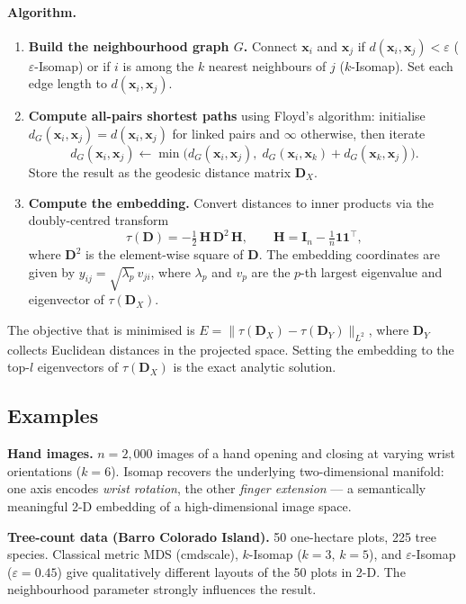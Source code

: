 \documentclass[11pt, oneside]{book}
\newcommand{\T}{^{\top}}
\begin{document}
\paragraph{Algorithm.}
\begin{enumerate}
  \item \textbf{Build the neighbourhood graph $G$.} Connect $\bm{x}_i$ and
        $\bm{x}_j$ if $d(\bm{x}_i,\bm{x}_j)<\varepsilon$ ($\varepsilon$-Isomap)
        or if $i$ is among the $k$ nearest neighbours of $j$ ($k$-Isomap).
        Set each edge length to $d(\bm{x}_i,\bm{x}_j)$.
  \item \textbf{Compute all-pairs shortest paths} using Floyd's algorithm:
        initialise $d_G(\bm{x}_i,\bm{x}_j)=d(\bm{x}_i,\bm{x}_j)$ for linked
        pairs and $\infty$ otherwise, then iterate
        \[d_G(\bm{x}_i,\bm{x}_j)\leftarrow
          \min\bigl(d_G(\bm{x}_i,\bm{x}_j),\;
                    d_G(\bm{x}_i,\bm{x}_k)+d_G(\bm{x}_k,\bm{x}_j)\bigr).\]
        Store the result as the geodesic distance matrix $\bm{D}_X$.
  \item \textbf{Compute the embedding.} Convert distances to inner products via
        the doubly-centred transform
        \[\tau(\bm{D}) = -\tfrac{1}{2}\,\bm{H}\,\bm{D}^2\,\bm{H},\qquad
          \bm{H}=\bm{I}_n-\tfrac{1}{n}\mathbf{1}\mathbf{1}\T,\]
        where $\bm{D}^2$ is the element-wise square of $\bm{D}$.
        The embedding coordinates are given by
        $y_{ij}=\sqrt{\lambda_p}\,v_{ji}$,
        where $\lambda_p$ and $v_p$ are the $p$-th largest eigenvalue and
        eigenvector of $\tau(\bm{D}_X)$.
\end{enumerate}

The objective that is minimised is
$E=\|\tau(\bm{D}_X)-\tau(\bm{D}_Y)\|_{L^2}$, where
$\bm{D}_Y$ collects Euclidean distances in the projected space.
Setting the embedding to the top-$l$ eigenvectors of $\tau(\bm{D}_X)$ is the
exact analytic solution.

\subsection{Examples}

\textbf{Hand images.} $n=2{,}000$ images of a hand opening and closing at
varying wrist orientations ($k=6$).
Isomap recovers the underlying two-dimensional manifold: one axis encodes
\emph{wrist rotation}, the other \emph{finger extension} — a semantically
meaningful 2-D embedding of a high-dimensional image space.

\textbf{Tree-count data (Barro Colorado Island).} 50 one-hectare plots, 225
tree species.
Classical metric MDS (cmdscale), $k$-Isomap ($k=3$, $k=5$), and
$\varepsilon$-Isomap ($\varepsilon=0.45$) give qualitatively different layouts
of the 50 plots in 2-D.
The neighbourhood parameter strongly influences the result.
\end{document}
